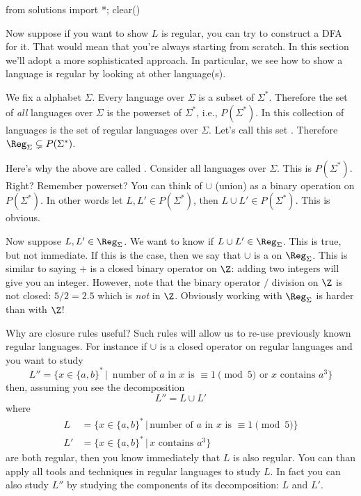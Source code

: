 \begin{python0}
  from solutions import *; clear()
\end{python0}

Now suppose if you want to show $L$ is regular, you can try to
construct a DFA for it. That would mean that you're always starting
from scratch. In this section we'll adopt a more sophisticated
approach. In particular, we see how to show a language is regular by
looking at other language(s).

We fix a alphabet $\Sigma$.
Every language over $\Sigma$ is a
subset of $\Sigma^*$. Therefore the set of
\textit{all} languages
over $\Sigma$ is the powerset of $\Sigma^*$, i.e., $P(\Sigma^*)$.
In this collection of languages is the set of regular languages
over $\Sigma$. Let's call this set . Therefore
$\Reg_\Sigma \subsetneq P(\Sigma^*)$.

Here's why the above are called . Consider all
languages over $\Sigma$. This is $P(\Sigma^*)$. Right? Remember
powerset? You can think of $\cup$ (union) as a binary operation on
$P(\Sigma^*)$. In other words let $L, L' \in P(\Sigma^*)$, then
$L \cup L' \in P(\Sigma^*)$.
This is obvious.

Now suppose $L,L' \in \Reg_\Sigma$.
We want to know if $L \cup L' \in \Reg_\Sigma$.
This is true, but not immediate.
If this is the case, then
we say that $\cup$ is a  on $\Reg_\Sigma$.
This is similar to saying $+$ is a closed binary operator on $\Z$: adding two integers
will give you an integer.
However, note that the binary operator $/$ division on $\Z$ is not closed:
$5 / 2 = 2.5$ which is \textit{not} in $\Z$.
Obviously working with $\Reg_\Sigma$ is harder than with $\Z$!

Why are closure rules useful? Such rules will allow us to re-use previously
known regular languages. For instance if $\cup$ is a closed
operator on regular languages and
you want to study
\[
  L'' = \{ x \in \{a,b\}^* \,|\, \text{ number of $a$ in $x$ is } \equiv 1 \pmod{5}
  \text{ or $x$ contains $a^3$} \}
\]
then, assuming you see the decomposition
\[
L'' = L \cup L'
\]
where
\begin{align*}
 L &= \{ x \in \{a,b\}^* \,|\, \text{number of $a$ in $x$ is } \equiv 1 \pmod{5}
 \}\\
 L' &= \{ x \in \{a,b\}^* \,|\, x \text{ contains } a^3 \}
\end{align*}
are both regular, then you know immediately that $L$ is also regular.
You can than apply all tools and techniques in regular languages to study $L$.
In fact you can also study $L''$ by studying the components of
its decomposition: $L$ and $L'$.

